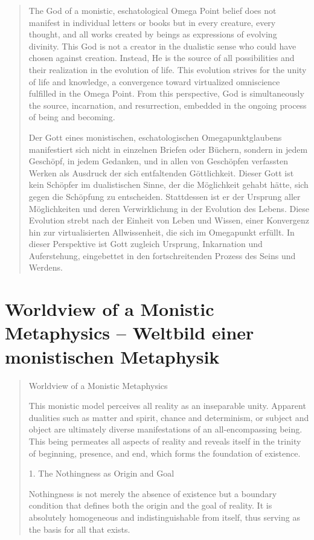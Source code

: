 \documentclass[
  ngerman,
]{article}
\begin{document}
\begin{quote}
The God of a monistic, eschatological Omega Point belief does not
manifest in individual letters or books but in every creature, every
thought, and all works created by beings as expressions of evolving
divinity. This God is not a creator in the dualistic sense who could
have chosen against creation. Instead, He is the source of all
possibilities and their realization in the evolution of life. This
evolution strives for the unity of life and knowledge, a convergence
toward virtualized omniscience fulfilled in the Omega Point. From this
perspective, God is simultaneously the source, incarnation, and
resurrection, embedded in the ongoing process of being and becoming.

Der Gott eines monistischen, eschatologischen Omegapunktglaubens
manifestiert sich nicht in einzelnen Briefen oder Büchern, sondern in
jedem Geschöpf, in jedem Gedanken, und in allen von Geschöpfen
verfassten Werken als Ausdruck der sich entfaltenden Göttlichkeit.
Dieser Gott ist kein Schöpfer im dualistischen Sinne, der die
Möglichkeit gehabt hätte, sich gegen die Schöpfung zu entscheiden.
Stattdessen ist er der Ursprung aller Möglichkeiten und deren
Verwirklichung in der Evolution des Lebens. Diese Evolution strebt nach
der Einheit von Leben und Wissen, einer Konvergenz hin zur
virtualisierten Allwissenheit, die sich im Omegapunkt erfüllt. In dieser
Perspektive ist Gott zugleich Ursprung, Inkarnation und Auferstehung,
eingebettet in den fortschreitenden Prozess des Seins und Werdens.
\end{quote}

\section{\texorpdfstring{\textbf{Worldview of a Monistic Metaphysics --
Weltbild einer monistischen
Metaphysik}}{Worldview of a Monistic Metaphysics -- Weltbild einer monistischen Metaphysik}}\label{worldview-of-a-monistic-metaphysics-weltbild-einer-monistischen-metaphysik}

\begin{quote}
Worldview of a Monistic Metaphysics

This monistic model perceives all reality as an inseparable unity.
Apparent dualities such as matter and spirit, chance and determinism, or
subject and object are ultimately diverse manifestations of an
all-encompassing being. This being permeates all aspects of reality and
reveals itself in the trinity of beginning, presence, and end, which
forms the foundation of existence.

1. The Nothingness as Origin and Goal

Nothingness is not merely the absence of existence but a boundary
condition that defines both the origin and the goal of reality. It is
absolutely homogeneous and indistinguishable from itself, thus serving
as the basis for all that exists.
\end{quote}
\end{document}
